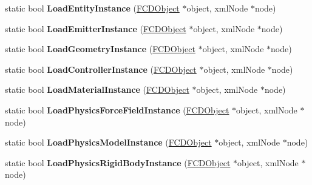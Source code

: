 \begin{DoxyCompactItemize}
\item 
\hypertarget{classFArchiveXML_a900937020ac203ca5350ba3caadc7d28}{
static bool {\bfseries LoadEntityInstance} (\hyperlink{classFCDObject}{FCDObject} $\ast$object, xmlNode $\ast$node)}
\label{classFArchiveXML_a900937020ac203ca5350ba3caadc7d28}

\item 
\hypertarget{classFArchiveXML_ae91329905ec5e6b5a3e07b3ab6b0597c}{
static bool {\bfseries LoadEmitterInstance} (\hyperlink{classFCDObject}{FCDObject} $\ast$object, xmlNode $\ast$node)}
\label{classFArchiveXML_ae91329905ec5e6b5a3e07b3ab6b0597c}

\item 
\hypertarget{classFArchiveXML_a09864f68aba557a580a42d6b0091d121}{
static bool {\bfseries LoadGeometryInstance} (\hyperlink{classFCDObject}{FCDObject} $\ast$object, xmlNode $\ast$node)}
\label{classFArchiveXML_a09864f68aba557a580a42d6b0091d121}

\item 
\hypertarget{classFArchiveXML_a0a00cd269234eb419f4cd6a66854afad}{
static bool {\bfseries LoadControllerInstance} (\hyperlink{classFCDObject}{FCDObject} $\ast$object, xmlNode $\ast$node)}
\label{classFArchiveXML_a0a00cd269234eb419f4cd6a66854afad}

\item 
\hypertarget{classFArchiveXML_a8cacba7e220337fafb9af191769ef8ef}{
static bool {\bfseries LoadMaterialInstance} (\hyperlink{classFCDObject}{FCDObject} $\ast$object, xmlNode $\ast$node)}
\label{classFArchiveXML_a8cacba7e220337fafb9af191769ef8ef}

\item 
\hypertarget{classFArchiveXML_a1bdb975b6666fe700a24d6e31d1b02f6}{
static bool {\bfseries LoadPhysicsForceFieldInstance} (\hyperlink{classFCDObject}{FCDObject} $\ast$object, xmlNode $\ast$node)}
\label{classFArchiveXML_a1bdb975b6666fe700a24d6e31d1b02f6}

\item 
\hypertarget{classFArchiveXML_a601db1bc80cc144e179fef96dd82f6dc}{
static bool {\bfseries LoadPhysicsModelInstance} (\hyperlink{classFCDObject}{FCDObject} $\ast$object, xmlNode $\ast$node)}
\label{classFArchiveXML_a601db1bc80cc144e179fef96dd82f6dc}

\item 
\hypertarget{classFArchiveXML_a844e802b67f84ad81301a339e76d3b7b}{
static bool {\bfseries LoadPhysicsRigidBodyInstance} (\hyperlink{classFCDObject}{FCDObject} $\ast$object, xmlNode $\ast$node)}
\label{classFArchiveXML_a844e802b67f84ad81301a339e76d3b7b}


\end{DoxyCompactItemize}
